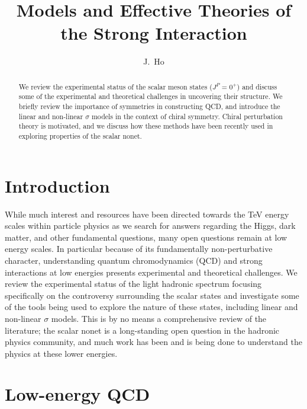 \documentclass[aps,prd,onecolumn,showpacs,amsmath,amssymb,nofootinbib]{revtex4} \pdfoutput=1
\begin{document}
\title{Models and Effective Theories of the Strong Interaction}

\author{J.~Ho}

\begin{abstract}
We review the experimental status of the scalar meson states ($J^{P} = 0^{+}$) and discuss some of the experimental and theoretical challenges in uncovering their structure. We briefly review the importance of symmetries in constructing QCD, and introduce the linear and non-linear $\sigma$ models in the context of chiral symmetry. Chiral perturbation theory is motivated, and we discuss how these methods have been recently used in exploring properties of the scalar nonet.
\end{abstract}
\maketitle
\section{Introduction}\label{I}
While much interest and resources have been directed towards the TeV energy scales within particle physics as we search for answers regarding the Higgs, dark matter, and other fundamental questions, many open questions remain at low energy scales. In particular because of its fundamentally non-perturbative character, understanding quantum chromodynamics (QCD) and strong interactions at low energies presents experimental and theoretical challenges. We review the experimental status of the light hadronic spectrum focusing specifically on the controversy surrounding the scalar states and investigate some of the tools being used to explore the nature of these states, including linear and non-linear $\sigma$ models. This is by no means a comprehensive review of the literature; the scalar nonet is a long-standing open question in the hadronic physics community, and much work has been and is being done to understand the physics at these lower energies. 

\section{Low-energy QCD}\label{II}
\end{document}
